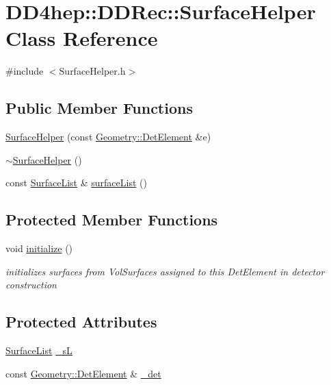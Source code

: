 \hypertarget{class_d_d4hep_1_1_d_d_rec_1_1_surface_helper}{
\section{DD4hep::DDRec::SurfaceHelper Class Reference}
\label{class_d_d4hep_1_1_d_d_rec_1_1_surface_helper}
}


{\ttfamily \#include $<$SurfaceHelper.h$>$}\subsection*{Public Member Functions}
\begin{DoxyCompactItemize}
\item 
\hyperlink{class_d_d4hep_1_1_d_d_rec_1_1_surface_helper_a76e5fe1cc5622045a000d2d94fdffc4d}{SurfaceHelper} (const \hyperlink{class_d_d4hep_1_1_geometry_1_1_det_element}{Geometry::DetElement} \&e)
\item 
\hyperlink{class_d_d4hep_1_1_d_d_rec_1_1_surface_helper_ae56de2da052504fa76ade5995a2d363d}{$\sim$SurfaceHelper} ()
\item 
const \hyperlink{class_d_d4hep_1_1_d_d_rec_1_1_surface_list}{SurfaceList} \& \hyperlink{class_d_d4hep_1_1_d_d_rec_1_1_surface_helper_afd1438e4c040058aac95a8af0167c91d}{surfaceList} ()
\end{DoxyCompactItemize}
\subsection*{Protected Member Functions}
\begin{DoxyCompactItemize}
\item 
void \hyperlink{class_d_d4hep_1_1_d_d_rec_1_1_surface_helper_ac394507ee2065b75f9540b388fd87170}{initialize} ()
\begin{DoxyCompactList}\small\item\em initializes surfaces from VolSurfaces assigned to this DetElement in detector construction \item\end{DoxyCompactList}\end{DoxyCompactItemize}
\subsection*{Protected Attributes}
\begin{DoxyCompactItemize}
\item 
\hyperlink{class_d_d4hep_1_1_d_d_rec_1_1_surface_list}{SurfaceList} \hyperlink{class_d_d4hep_1_1_d_d_rec_1_1_surface_helper_a9284825af9dcbb9557f0cde59090dcd6}{\_\-sL}
\item 
const \hyperlink{class_d_d4hep_1_1_geometry_1_1_det_element}{Geometry::DetElement} \& \hyperlink{class_d_d4hep_1_1_d_d_rec_1_1_surface_helper_a879149ec569894c3080e2e0f3464dd8d}{\_\-det}
\end{DoxyCompactItemize}



